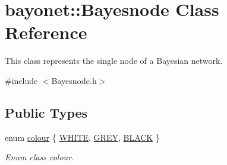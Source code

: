 \hypertarget{classbayonet_1_1_bayesnode}{\section{bayonet\-:\-:Bayesnode Class Reference}
\label{classbayonet_1_1_bayesnode}
}


This class represents the single node of a Bayesian network.  




{\ttfamily \#include $<$Bayesnode.\-h$>$}

\subsection*{Public Types}
\begin{DoxyCompactItemize}
\item 
enum \hyperlink{classbayonet_1_1_bayesnode_aaf4b5ea18ef0c14f2baae9bff0ef9199}{colour} \{ \hyperlink{classbayonet_1_1_bayesnode_aaf4b5ea18ef0c14f2baae9bff0ef9199ab016e4238c81c447026b8a4a877657e7}{W\-H\-I\-T\-E}, 
\hyperlink{classbayonet_1_1_bayesnode_aaf4b5ea18ef0c14f2baae9bff0ef9199acad350a293ba85136b727ae06985dfd0}{G\-R\-E\-Y}, 
\hyperlink{classbayonet_1_1_bayesnode_aaf4b5ea18ef0c14f2baae9bff0ef9199a3ce789844020e57e0bdb4fea062c7380}{B\-L\-A\-C\-K}
 \}
\begin{DoxyCompactList}\small\item\em Enum class colour. \end{DoxyCompactList}\end{DoxyCompactItemize}
